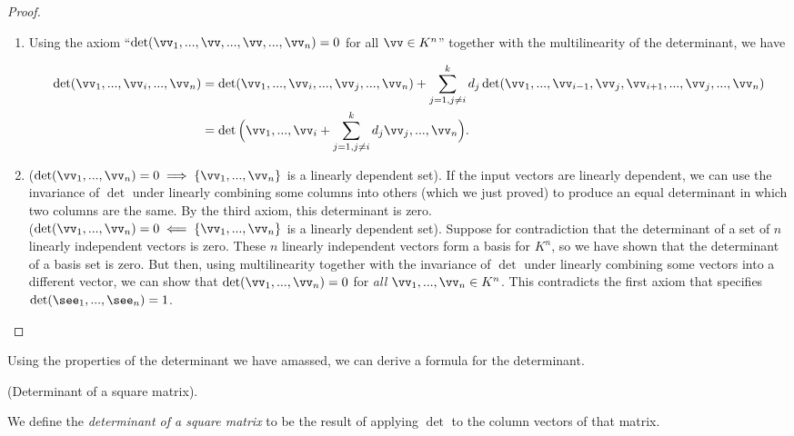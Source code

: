 \begin{proof}
    \mbox{} \\
    \begin{enumerate}
        \item 
        
        Using the axiom ``$\det(\vv_1, ..., \vv, ..., \vv, ..., \vv_n) = 0$ for all $\vv \in K^n$'' together with the multilinearity of the determinant, we have
        
        \begin{align*}
            \det(\vv_1, ..., \vv_i, ..., \vv_n)
            &= \det(\vv_1, ..., \vv_i, ..., \vv_j, ..., \vv_n) + \sum_{j = 1, j \neq i}^k d_j \det(\vv_1, ..., \vv_{i - 1}, \vv_j, \vv_{i + 1}, ..., \vv_j, ..., \vv_n) \\
            &= \det\Big( \vv_1, ..., \vv_i + \sum_{j = 1, j \neq i}^k d_j \vv_j, ..., \vv_n \Big).
        \end{align*}
        
        \item \indent ($\det(\vv_1, ..., \vv_n) = 0 \implies \{\vv_1, ..., \vv_n\}$ is a linearly dependent set). If the input vectors are linearly dependent, we can use the invariance of $\det$ under linearly combining some columns into others (which we just proved) to produce an equal determinant in which two columns are the same. By the third axiom, this determinant is zero.
        \\ \indent ($\det(\vv_1, ..., \vv_n) = 0 \impliedby \{\vv_1, ..., \vv_n\}$ is a linearly dependent set). Suppose for contradiction that the determinant of a set of $n$ linearly independent vectors is zero. These $n$ linearly independent vectors form a basis for $K^n$, so we have shown that the determinant of a basis set is zero. But then, using multilinearity together with the invariance of $\det$ under linearly combining some vectors into a different vector, we can show that $\det(\vv_1, ..., \vv_n) = 0$ for \textit{all} $\vv_1, ..., \vv_n \in K^n$. This contradicts the first axiom that specifies $\det(\see_1, ..., \see_n) = 1$.
    \end{enumerate}
\end{proof}

Using the properties of the determinant we have amassed, we can derive a formula for the determinant.

\begin{defn}
    (Determinant of a square matrix). 
    
    We define the \textit{determinant of a square matrix} to be the result of applying $\det$ to the column vectors of that matrix.
\end{defn}

